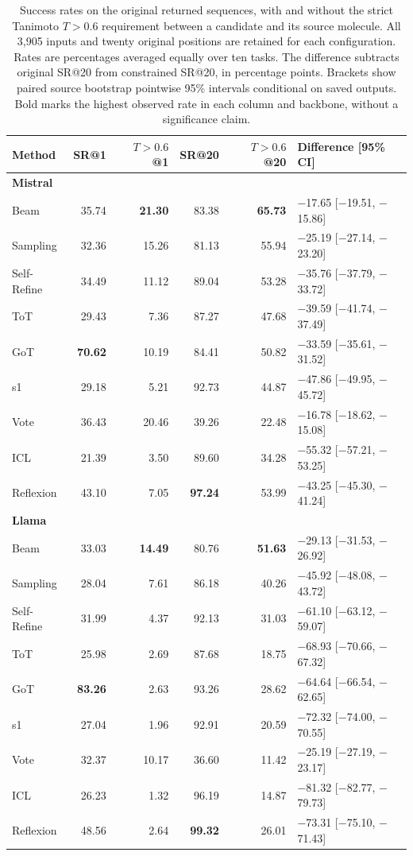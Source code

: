 \begin{table}[!htbp]
\centering
\setlength{\tabcolsep}{4pt}
\caption{Success rates on the original returned sequences, with and without the strict Tanimoto $T>0.6$ requirement between a candidate and its source molecule. All 3,905 inputs and twenty original positions are retained for each configuration. Rates are percentages averaged equally over ten tasks. The difference subtracts original SR@20 from constrained SR@20, in percentage points. Brackets show paired source bootstrap pointwise 95\% intervals conditional on saved outputs. Bold marks the highest observed rate in each column and backbone, without a significance claim.}
\label{tab:supp-similarity}
\begin{tabular}{lrrrrl}
\toprule
Method & SR@1 & $T>0.6$ @1 & SR@20 & $T>0.6$ @20 & Difference [95\% CI] \\
\midrule
\multicolumn{6}{l}{\textbf{Mistral}} \\
Beam & 35.74 & \textbf{21.30} & 83.38 & \textbf{65.73} & $-$17.65 [$-$19.51, $-$15.86] \\
Sampling & 32.36 & 15.26 & 81.13 & 55.94 & $-$25.19 [$-$27.14, $-$23.20] \\
Self-Refine & 34.49 & 11.12 & 89.04 & 53.28 & $-$35.76 [$-$37.79, $-$33.72] \\
ToT & 29.43 & 7.36 & 87.27 & 47.68 & $-$39.59 [$-$41.74, $-$37.49] \\
GoT & \textbf{70.62} & 10.19 & 84.41 & 50.82 & $-$33.59 [$-$35.61, $-$31.52] \\
s1 & 29.18 & 5.21 & 92.73 & 44.87 & $-$47.86 [$-$49.95, $-$45.72] \\
Vote & 36.43 & 20.46 & 39.26 & 22.48 & $-$16.78 [$-$18.62, $-$15.08] \\
ICL & 21.39 & 3.50 & 89.60 & 34.28 & $-$55.32 [$-$57.21, $-$53.25] \\
Reflexion & 43.10 & 7.05 & \textbf{97.24} & 53.99 & $-$43.25 [$-$45.30, $-$41.24] \\
\midrule
\multicolumn{6}{l}{\textbf{Llama}} \\
Beam & 33.03 & \textbf{14.49} & 80.76 & \textbf{51.63} & $-$29.13 [$-$31.53, $-$26.92] \\
Sampling & 28.04 & 7.61 & 86.18 & 40.26 & $-$45.92 [$-$48.08, $-$43.72] \\
Self-Refine & 31.99 & 4.37 & 92.13 & 31.03 & $-$61.10 [$-$63.12, $-$59.07] \\
ToT & 25.98 & 2.69 & 87.68 & 18.75 & $-$68.93 [$-$70.66, $-$67.32] \\
GoT & \textbf{83.26} & 2.63 & 93.26 & 28.62 & $-$64.64 [$-$66.54, $-$62.65] \\
s1 & 27.04 & 1.96 & 92.91 & 20.59 & $-$72.32 [$-$74.00, $-$70.55] \\
Vote & 32.37 & 10.17 & 36.60 & 11.42 & $-$25.19 [$-$27.19, $-$23.17] \\
ICL & 26.23 & 1.32 & 96.19 & 14.87 & $-$81.32 [$-$82.77, $-$79.73] \\
Reflexion & 48.56 & 2.64 & \textbf{99.32} & 26.01 & $-$73.31 [$-$75.10, $-$71.43] \\
\bottomrule
\end{tabular}
\end{table}
